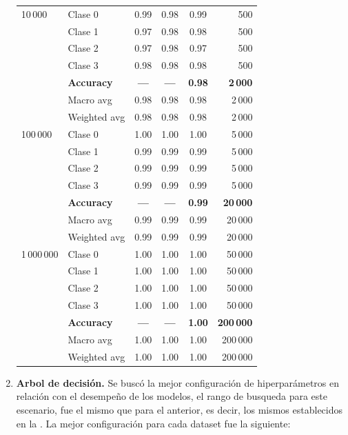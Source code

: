 \documentclass[12pt,a4paper]{article}
\begin{document}
\begin{enumerate}
\begin{longtable}{@{}l l c c c r@{}}
    10\,000 & Clase 0     & 0.99 & 0.98 & 0.99 & 500 \\
          & Clase 1      & 0.97 & 0.98 & 0.98 & 500 \\
          & Clase 2      & 0.97 & 0.98 & 0.97 & 500 \\
          & Clase 3      & 0.98 & 0.98 & 0.98 & 500 \\
          & \textbf{Accuracy}   & \textbf{—}   & \textbf{—}   & \textbf{0.98} & \textbf{2\,000} \\
          & Macro avg    & 0.98 & 0.98 & 0.98 & 2\,000 \\
          & Weighted avg & 0.98 & 0.98 & 0.98 & 2\,000 \\
    \addlinespace

    100\,000 & Clase 0    & 1.00 & 1.00 & 1.00 & 5\,000 \\
            & Clase 1     & 0.99 & 0.99 & 0.99 & 5\,000 \\
            & Clase 2     & 0.99 & 0.99 & 0.99 & 5\,000 \\
            & Clase 3     & 0.99 & 0.99 & 0.99 & 5\,000 \\
            & \textbf{Accuracy}   & \textbf{—}   & \textbf{—}   & \textbf{0.99} & \textbf{20\,000} \\
            & Macro avg    & 0.99 & 0.99 & 0.99 & 20\,000 \\
            & Weighted avg & 0.99 & 0.99 & 0.99 & 20\,000 \\
    \addlinespace

    1\,000\,000 & Clase 0  & 1.00 & 1.00 & 1.00 & 50\,000 \\
              & Clase 1   & 1.00 & 1.00 & 1.00 & 50\,000 \\
              & Clase 2   & 1.00 & 1.00 & 1.00 & 50\,000 \\
              & Clase 3   & 1.00 & 1.00 & 1.00 & 50\,000 \\
              & \textbf{Accuracy} & \textbf{—} & \textbf{—} & \textbf{1.00} & \textbf{200\,000} \\
              & Macro avg    & 1.00 & 1.00 & 1.00 & 200\,000 \\
              & Weighted avg & 1.00 & 1.00 & 1.00 & 200\,000 \\
  \end{longtable}

  \item \textbf{Arbol de decisión.}
  Se buscó la mejor configuración de hiperparámetros en relación con el desempeño de los modelos, el rango de 
  busqueda para este escenario, fue el mismo que para el anterior, es decir, los mismos establecidos en la 
  . La mejor configuración para cada dataset fue la siguiente:


\end{enumerate}
\end{document}
